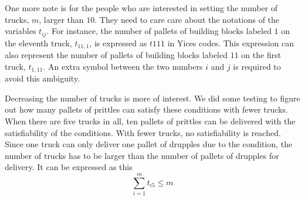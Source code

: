 \documentclass[11pt]{article}
\begin{document}
One more note is for the people who are interested in setting the number of trucks, $m$, larger than $10$. They need to care care about the notations of the variables $t_{ij}$. For instance, the number of pallets of building blocks labeled $1$ on the eleventh truck, $t_{11,1}$, is expressed as  $t111$ in Yices codes. This expression can also represent the number of pallets of building blocks labeled $11$ on the first truck, $t_{1,11}$. An extra symbol between the two numbers $i$ and $j$ is required to avoid this ambiguity.

Decreasing the number of trucks is more of interest. We did some testing to figure out how many pallets of prittles can satisfy these conditions with fewer trucks. When there are five trucks in all, ten pallets of prittles can be delivered with the satisfiability of the conditions. With fewer trucks, no satisfiability is reached. Since one truck can only deliver one pallet of drupples due to the condition, the number of trucks has to be larger than the number of pallets of drupples for delivery. It can be expressed as this
\[ \sum_{i=1}^m t_{i5}\leq m \]






\end{document}
